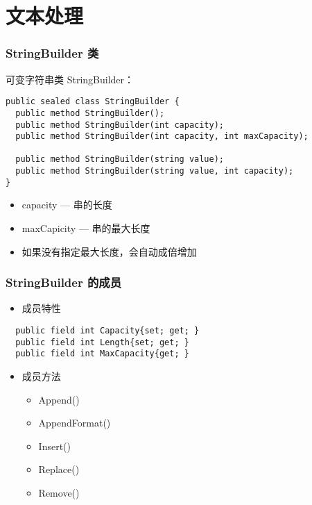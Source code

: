 \section{文本处理}

\begin{frame}[fragile]
\frametitle{StringBuilder 类}
可变字符串类 StringBuilder：
\begin{lstlisting}
public sealed class StringBuilder {
  public method StringBuilder();  
  public method StringBuilder(int capacity);  
  public method StringBuilder(int capacity, int maxCapacity);  
  
  public method StringBuilder(string value);  
  public method StringBuilder(string value, int capacity);  
}
\end{lstlisting}
\begin{itemize}
\item capacity --- 串的长度
\item maxCapicity --- 串的最大长度
\item 如果没有指定最大长度，会自动成倍增加
\end{itemize}
\end{frame}

\begin{frame}[fragile]
\frametitle{StringBuilder 的成员}
\begin{itemize}
\item 成员特性
\end{itemize}
\begin{lstlisting}
  public field int Capacity{set; get; } 
  public field int Length{set; get; } 
  public field int MaxCapacity{get; } 
\end{lstlisting}
\begin{itemize}
\item 成员方法
\begin{itemize}
\item Append()
\item AppendFormat()
\item Insert()
\item Replace()
\item Remove()
\end{itemize}
\end{itemize}
\end{frame}





